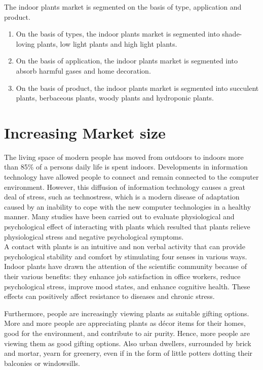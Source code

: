 \documentclass{article}
\begin{document}
The indoor plants market is segmented on the basis of type, application and product. 

\begin{enumerate}

\item On the basis of types, the indoor plants market is segmented into shade- loving plants, low light plants and high light plants.
\item On the basis of application, the indoor plants market is segmented into absorb harmful gases and home decoration.
\item On the basis of product, the indoor plants market is segmented into succulent plants, berbaceous plants, woody plants and hydroponic plants.
\end{enumerate}


\section*{Increasing Market size}
The living space of modern people has moved from outdoors to indoors more than 85\% of a persons daily life is spent indoors. Developments in information technology have allowed people to connect and remain connected to the computer environment. However, this diffusion of information technology causes a great deal of stress, such as technostress, which is a modern disease of adaptation caused by an inability to cope with the new computer technologies in a healthy manner. Many studies have been carried out to evaluate physiological and psychological effect of interacting with plants which resulted that plants relieve physiological stress and negative psychological symptoms.\\

 A contact with plants is an intuitive and non verbal activity that can provide psychological stability and comfort by stimulating four senses in various ways. Indoor plants have drawn the attention of the scientific community because of their various benefits: they enhance job satisfaction in office workers, reduce psychological stress, improve mood states, and enhance cognitive health. These effects can positively affect resistance to diseases and chronic stress.
 
Furthermore, people are increasingly viewing plants as suitable gifting options. More and more people are appreciating plants as décor items for their homes, good for the environment, and contribute to air purity. Hence, more people are viewing them as good gifting options. Also urban dwellers, surrounded by brick and mortar, yearn for greenery, even if in the form of little potters dotting their balconies or windowsills.
\end{document}
